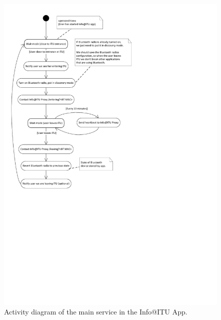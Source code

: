 \documentclass{ubicomp2011}
\begin{document}
\begin{figure}[t]
\begin{center}
\includegraphics[width=0.90\columnwidth]{android-app-activity-diagram.pdf}
\end{center}
\caption{Activity diagram of the main service in the Info@ITU App.}
\label{fig:android-app-activity-diagram}
\end{figure}




\end{document}
